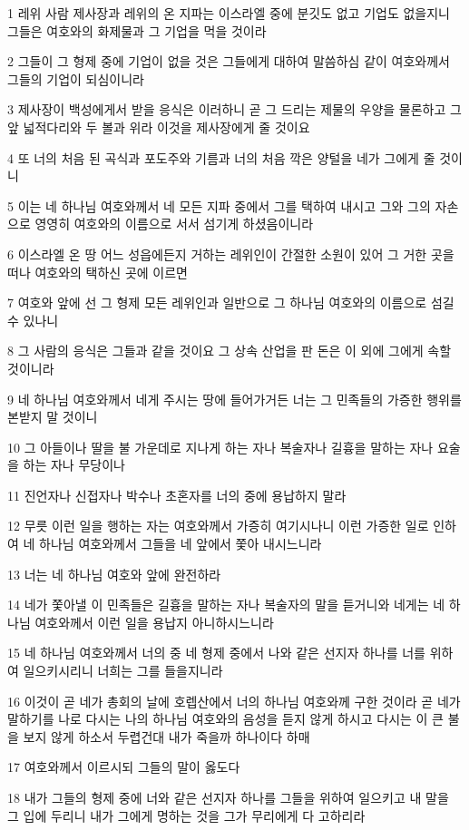 \par 1 레위 사람 제사장과 레위의 온 지파는 이스라엘 중에 분깃도 없고 기업도 없을지니 그들은 여호와의 화제물과 그 기업을 먹을 것이라
\par 2 그들이 그 형제 중에 기업이 없을 것은 그들에게 대하여 말씀하심 같이 여호와께서 그들의 기업이 되심이니라
\par 3 제사장이 백성에게서 받을 응식은 이러하니 곧 그 드리는 제물의 우양을 물론하고 그 앞 넓적다리와 두 볼과 위라 이것을 제사장에게 줄 것이요
\par 4 또 너의 처음 된 곡식과 포도주와 기름과 너의 처음 깍은 양털을 네가 그에게 줄 것이니
\par 5 이는 네 하나님 여호와께서 네 모든 지파 중에서 그를 택하여 내시고 그와 그의 자손으로 영영히 여호와의 이름으로 서서 섬기게 하셨음이니라
\par 6 이스라엘 온 땅 어느 성읍에든지 거하는 레위인이 간절한 소원이 있어 그 거한 곳을 떠나 여호와의 택하신 곳에 이르면
\par 7 여호와 앞에 선 그 형제 모든 레위인과 일반으로 그 하나님 여호와의 이름으로 섬길 수 있나니
\par 8 그 사람의 응식은 그들과 같을 것이요 그 상속 산업을 판 돈은 이 외에 그에게 속할 것이니라
\par 9 네 하나님 여호와께서 네게 주시는 땅에 들어가거든 너는 그 민족들의 가증한 행위를 본받지 말 것이니
\par 10 그 아들이나 딸을 불 가운데로 지나게 하는 자나 복술자나 길흉을 말하는 자나 요술을 하는 자나 무당이나
\par 11 진언자나 신접자나 박수나 초혼자를 너의 중에 용납하지 말라
\par 12 무릇 이런 일을 행하는 자는 여호와께서 가증히 여기시나니 이런 가증한 일로 인하여 네 하나님 여호와께서 그들을 네 앞에서 쫓아 내시느니라
\par 13 너는 네 하나님 여호와 앞에 완전하라
\par 14 네가 쫓아낼 이 민족들은 길흉을 말하는 자나 복술자의 말을 듣거니와 네게는 네 하나님 여호와께서 이런 일을 용납지 아니하시느니라
\par 15 네 하나님 여호와께서 너의 중 네 형제 중에서 나와 같은 선지자 하나를 너를 위하여 일으키시리니 너희는 그를 들을지니라
\par 16 이것이 곧 네가 총회의 날에 호렙산에서 너의 하나님 여호와께 구한 것이라 곧 네가 말하기를 나로 다시는 나의 하나님 여호와의 음성을 듣지 않게 하시고 다시는 이 큰 불을 보지 않게 하소서 두렵건대 내가 죽을까 하나이다 하매
\par 17 여호와께서 이르시되 그들의 말이 옳도다
\par 18 내가 그들의 형제 중에 너와 같은 선지자 하나를 그들을 위하여 일으키고 내 말을 그 입에 두리니 내가 그에게 명하는 것을 그가 무리에게 다 고하리라
